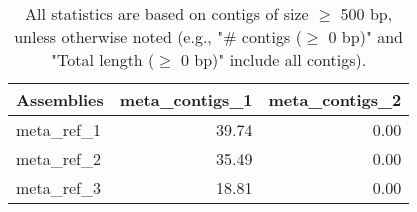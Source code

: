 \documentclass[12pt,a4paper]{article}
\begin{document}
\begin{table}[ht]
\begin{center}
\caption{All statistics are based on contigs of size $\geq$ 500 bp, unless otherwise noted (e.g., "\# contigs ($\geq$ 0 bp)" and "Total length ($\geq$ 0 bp)" include all contigs).}
\begin{tabular}{|l*{2}{|r}|}
\hline
Assemblies & meta\_contigs\_1 & meta\_contigs\_2 \\ \hline
meta\_ref\_1 & 39.74 & 0.00 \\ \hline
meta\_ref\_2 & 35.49 & 0.00 \\ \hline
meta\_ref\_3 & 18.81 & 0.00 \\ \hline
\end{tabular}
\end{center}
\end{table}
\end{document}
